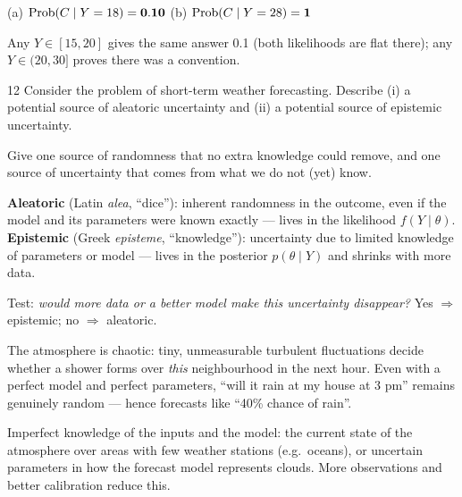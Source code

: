 \documentclass[11pt]{article}
\begin{document}
\begin{answer}
(a) $\mathrm{Prob}(C\mid Y=18)=\mathbf{0.10}$ \qquad (b) $\mathrm{Prob}(C\mid Y=28)=\mathbf{1}$
\end{answer}

\begin{takeaway}
Any $Y\in[15,20]$ gives the same answer 0.1 (both likelihoods are flat there); any $Y\in(20,30]$ proves there was a convention.
\end{takeaway}


\begin{problem}{12}
Consider the problem of short-term weather forecasting. Describe (i) a potential source of aleatoric uncertainty and (ii) a potential source of epistemic uncertainty.
\end{problem}

\begin{restate}
Give one source of randomness that no extra knowledge could remove, and one source of uncertainty that comes from what we do not (yet) know.
\end{restate}

\begin{recall}
\textbf{Aleatoric} (Latin \emph{alea}, ``dice''): inherent randomness in the outcome, even if the model and its parameters were known exactly --- lives in the likelihood $f(Y\mid\theta)$.
\textbf{Epistemic} (Greek \emph{episteme}, ``knowledge''): uncertainty due to limited knowledge of parameters or model --- lives in the posterior $p(\theta\mid Y)$ and shrinks with more data.
\end{recall}

\begin{keyidea}
Test: \emph{would more data or a better model make this uncertainty disappear?} Yes $\Rightarrow$ epistemic; no $\Rightarrow$ aleatoric.
\end{keyidea}

\solution
{}
The atmosphere is chaotic: tiny, unmeasurable turbulent fluctuations decide whether a shower forms over \emph{this} neighbourhood in the next hour. Even with a perfect model and perfect parameters, ``will it rain at my house at 3 pm'' remains genuinely random --- hence forecasts like ``40\% chance of rain''.

Imperfect knowledge of the inputs and the model: the current state of the atmosphere over areas with few weather stations (e.g.\ oceans), or uncertain parameters in how the forecast model represents clouds. More observations and better calibration reduce this.
\end{document}

